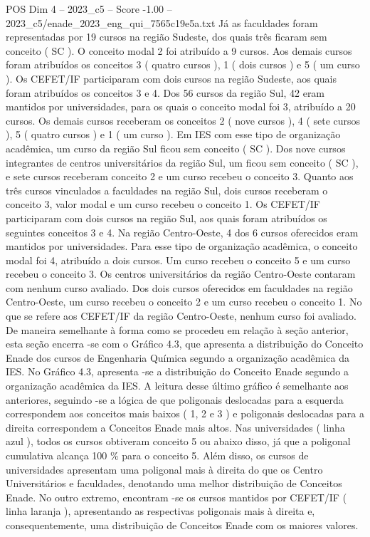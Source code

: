 \begin{textsample}{POS Dim 4 – 2023\_c5 – Score -1.00 – 2023\_c5/enade\_2023\_eng\_qui\_7565c19e5a.txt}
Já as faculdades foram representadas por 19 cursos na região Sudeste, dos quais três ficaram sem conceito ( SC ).
O conceito modal 2 foi atribuído a 9 cursos.
Aos demais cursos foram atribuídos os conceitos 3 ( quatro cursos ), 1 ( dois cursos ) e 5 ( um curso ).
Os CEFET/IF participaram com dois cursos na região Sudeste, aos quais foram atribuídos os conceitos 3 e 4.
Dos 56 cursos da região Sul, 42 eram mantidos por universidades, para os quais o conceito modal foi 3, atribuído a 20 cursos.
Os demais cursos receberam os conceitos 2 ( nove cursos ), 4 ( sete cursos ), 5 ( quatro cursos ) e 1 ( um curso ).
Em IES com esse tipo de organização acadêmica, um curso da região Sul ficou sem conceito ( SC ).
Dos nove cursos integrantes de centros universitários da região Sul, um ficou sem conceito ( SC ), e sete cursos receberam conceito 2 e um curso recebeu o conceito 3.
Quanto aos três cursos vinculados a faculdades na região Sul, dois cursos receberam o conceito 3, valor modal e um curso recebeu o conceito 1.
Os CEFET/IF participaram com dois cursos na região Sul, aos quais foram atribuídos os seguintes conceitos 3 e 4.
Na região Centro-Oeste, 4 dos 6 cursos oferecidos eram mantidos por universidades.
Para esse tipo de organização acadêmica, o conceito modal foi 4, atribuído a dois cursos.
Um curso recebeu o conceito 5 e um curso recebeu o conceito 3.
Os centros universitários da região Centro-Oeste contaram com nenhum curso avaliado.
Dos dois cursos oferecidos em faculdades na região Centro-Oeste, um curso recebeu o conceito 2 e um curso recebeu o conceito 1.
No que se refere aos CEFET/IF da região Centro-Oeste, nenhum curso foi avaliado.
De maneira semelhante à forma como se procedeu em relação à seção anterior, esta seção encerra -se com o Gráfico 4.3, que apresenta a distribuição do Conceito Enade dos cursos de Engenharia Química segundo a organização acadêmica da IES.
No Gráfico 4.3, apresenta -se a distribuição do Conceito Enade segundo a organização acadêmica da IES.
A leitura desse último gráfico é semelhante aos anteriores, seguindo -se a lógica de que poligonais deslocadas para a esquerda correspondem aos conceitos mais baixos ( 1, 2 e 3 ) e poligonais deslocadas para a direita correspondem a Conceitos Enade mais altos.
Nas universidades ( linha azul ), todos os cursos obtiveram conceito 5 ou abaixo disso, já que a poligonal cumulativa alcança 100 \% para o conceito 5.
Além disso, os cursos de universidades apresentam uma poligonal mais à direita do que os Centro Universitários e faculdades, denotando uma melhor distribuição de Conceitos Enade.
No outro extremo, encontram -se os cursos mantidos por CEFET/IF ( linha laranja ), apresentando as respectivas poligonais mais à direita e, consequentemente, uma distribuição de Conceitos Enade com os maiores valores.

\end{textsample}
